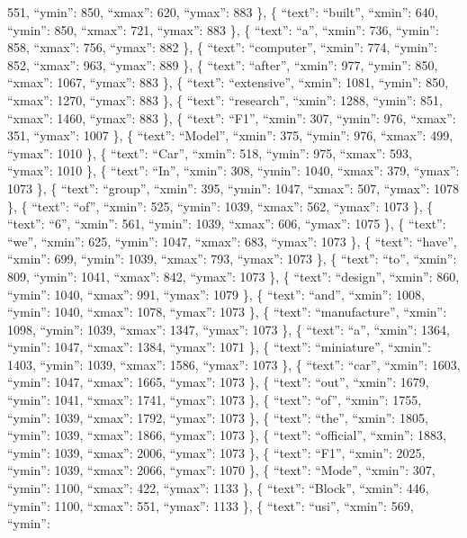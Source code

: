 \documentclass[
]{article}
\begin{document}
551, ``ymin'': 850, ``xmax'': 620, ``ymax'': 883 \}, \{ ``text'':
``built'', ``xmin'': 640, ``ymin'': 850, ``xmax'': 721, ``ymax'': 883
\}, \{ ``text'': ``a'', ``xmin'': 736, ``ymin'': 858, ``xmax'': 756,
``ymax'': 882 \}, \{ ``text'': ``computer'', ``xmin'': 774, ``ymin'':
852, ``xmax'': 963, ``ymax'': 889 \}, \{ ``text'': ``after'', ``xmin'':
977, ``ymin'': 850, ``xmax'': 1067, ``ymax'': 883 \}, \{ ``text'':
``extensive'', ``xmin'': 1081, ``ymin'': 850, ``xmax'': 1270, ``ymax'':
883 \}, \{ ``text'': ``research'', ``xmin'': 1288, ``ymin'': 851,
``xmax'': 1460, ``ymax'': 883 \}, \{ ``text'': ``F1'', ``xmin'': 307,
``ymin'': 976, ``xmax'': 351, ``ymax'': 1007 \}, \{ ``text'': ``Model'',
``xmin'': 375, ``ymin'': 976, ``xmax'': 499, ``ymax'': 1010 \}, \{
``text'': ``Car'', ``xmin'': 518, ``ymin'': 975, ``xmax'': 593,
``ymax'': 1010 \}, \{ ``text'': ``In'', ``xmin'': 308, ``ymin'': 1040,
``xmax'': 379, ``ymax'': 1073 \}, \{ ``text'': ``group'', ``xmin'': 395,
``ymin'': 1047, ``xmax'': 507, ``ymax'': 1078 \}, \{ ``text'': ``of'',
``xmin'': 525, ``ymin'': 1039, ``xmax'': 562, ``ymax'': 1073 \}, \{
``text'': ``6'', ``xmin'': 561, ``ymin'': 1039, ``xmax'': 606, ``ymax'':
1075 \}, \{ ``text'': ``we'', ``xmin'': 625, ``ymin'': 1047, ``xmax'':
683, ``ymax'': 1073 \}, \{ ``text'': ``have'', ``xmin'': 699, ``ymin'':
1039, ``xmax'': 793, ``ymax'': 1073 \}, \{ ``text'': ``to'', ``xmin'':
809, ``ymin'': 1041, ``xmax'': 842, ``ymax'': 1073 \}, \{ ``text'':
``design'', ``xmin'': 860, ``ymin'': 1040, ``xmax'': 991, ``ymax'': 1079
\}, \{ ``text'': ``and'', ``xmin'': 1008, ``ymin'': 1040, ``xmax'':
1078, ``ymax'': 1073 \}, \{ ``text'': ``manufacture'', ``xmin'': 1098,
``ymin'': 1039, ``xmax'': 1347, ``ymax'': 1073 \}, \{ ``text'': ``a'',
``xmin'': 1364, ``ymin'': 1047, ``xmax'': 1384, ``ymax'': 1071 \}, \{
``text'': ``miniature'', ``xmin'': 1403, ``ymin'': 1039, ``xmax'': 1586,
``ymax'': 1073 \}, \{ ``text'': ``car'', ``xmin'': 1603, ``ymin'': 1047,
``xmax'': 1665, ``ymax'': 1073 \}, \{ ``text'': ``out'', ``xmin'': 1679,
``ymin'': 1041, ``xmax'': 1741, ``ymax'': 1073 \}, \{ ``text'': ``of'',
``xmin'': 1755, ``ymin'': 1039, ``xmax'': 1792, ``ymax'': 1073 \}, \{
``text'': ``the'', ``xmin'': 1805, ``ymin'': 1039, ``xmax'': 1866,
``ymax'': 1073 \}, \{ ``text'': ``official'', ``xmin'': 1883, ``ymin'':
1039, ``xmax'': 2006, ``ymax'': 1073 \}, \{ ``text'': ``F1'', ``xmin'':
2025, ``ymin'': 1039, ``xmax'': 2066, ``ymax'': 1070 \}, \{ ``text'':
``Mode'', ``xmin'': 307, ``ymin'': 1100, ``xmax'': 422, ``ymax'': 1133
\}, \{ ``text'': ``Block'', ``xmin'': 446, ``ymin'': 1100, ``xmax'':
551, ``ymax'': 1133 \}, \{ ``text'': ``usi'', ``xmin'': 569, ``ymin'':
\end{document}
